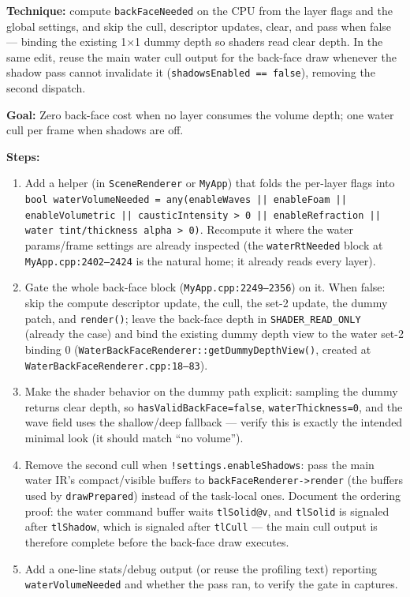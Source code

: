 \documentclass[11pt,a4paper]{article}
\begin{document}
\textbf{Technique:} compute \texttt{backFaceNeeded} on the CPU from the layer flags and the global settings, and skip the cull, descriptor updates, clear, and pass when
false --- binding the existing 1$\times$1 dummy depth so shaders read clear depth. In the same edit, reuse the main water cull output for the back-face draw whenever the
shadow pass cannot invalidate it (\texttt{shadowsEnabled == false}), removing the second dispatch.

\begin{tcolorbox}[promptbox={Prompt: Make the Back-Face Pass Demand-Driven and Reuse the Main Cull}]
\textbf{Goal:} Zero back-face cost when no layer consumes the volume depth; one water cull per frame when shadows are off.

\textbf{Steps:}
\begin{enumerate}
    \item Add a helper (in \texttt{SceneRenderer} or \texttt{MyApp}) that folds the per-layer flags into \texttt{bool waterVolumeNeeded = any(enableWaves || enableFoam ||
    enableVolumetric || causticIntensity > 0 || enableRefraction || water tint/thickness alpha > 0)}. Recompute it where the water params/frame settings are already
    inspected (the \texttt{waterRtNeeded} block at \texttt{MyApp.cpp:2402--2424} is the natural home; it already reads every layer).
    \item Gate the whole back-face block (\texttt{MyApp.cpp:2249--2356}) on it. When false: skip the compute descriptor update, the cull, the set-2 update, the dummy patch,
    and \texttt{render()}; leave the back-face depth in \texttt{SHADER\_READ\_ONLY} (already the case) and bind the existing dummy depth view to the water set-2 binding 0
    (\texttt{WaterBackFaceRenderer::getDummyDepthView()}, created at \texttt{WaterBackFaceRenderer.cpp:18--83}).
    \item Make the shader behavior on the dummy path explicit: sampling the dummy returns clear depth, so \texttt{hasValidBackFace=false}, \texttt{waterThickness=0}, and the
    wave field uses the shallow/deep fallback --- verify this is exactly the intended minimal look (it should match ``no volume'').
    \item Remove the second cull when \texttt{!settings.enableShadows}: pass the main water IR's compact/visible buffers to \texttt{backFaceRenderer->render} (the buffers used
    by \texttt{drawPrepared}) instead of the task-local ones. Document the ordering proof: the water command buffer waits \texttt{tlSolid@v}, and \texttt{tlSolid} is signaled
    after \texttt{tlShadow}, which is signaled after \texttt{tlCull} --- the main cull output is therefore complete before the back-face draw executes.
    \item Add a one-line stats/debug output (or reuse the profiling text) reporting \texttt{waterVolumeNeeded} and whether the pass ran, to verify the gate in captures.
\end{enumerate}


\end{tcolorbox}
\end{document}
